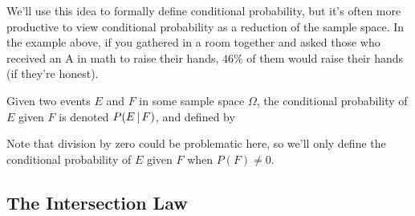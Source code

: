 \par
We'll use this idea to formally define conditional probability, but it's often more productive to view conditional probability as a reduction of the sample space. In the example above, if you gathered  in a room together and asked those who received an A in math to raise their hands, $46\%$ of them would raise their hands (if they're honest).
\par
\begin{defn}\label{conditionalprob}
Given two events $E$ and $F$ in some sample space $\Omega$, the conditional probability of $E$ given $F$ is denoted $P(E \,|\, F)$, and defined by
\end{defn}
Note that division by zero could be problematic here, so we'll only define the conditional probability of $E$ given $F$ when $P(F) \neq 0$.

\subsection*{The Intersection Law}


